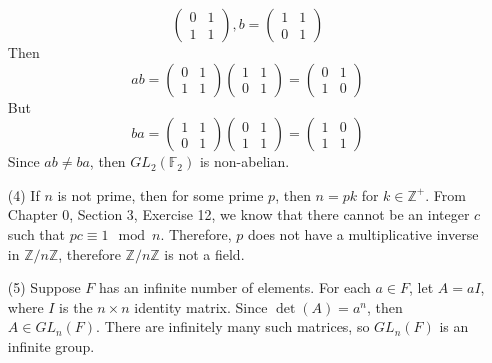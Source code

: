 \documentclass[12pt]{article}
\begin{document}
\begin{itemize}
$$\begin{pmatrix}
0 & 1 \\
1 & 1
\end{pmatrix}, b = \begin{pmatrix}
1 & 1 \\
0 & 1
\end{pmatrix}$$
Then
$$ab = \begin{pmatrix}
0 & 1 \\
1 & 1
\end{pmatrix}\begin{pmatrix}
1 & 1 \\
0 & 1
\end{pmatrix} = \begin{pmatrix}
0 & 1 \\
1 & 0
\end{pmatrix}$$
But
$$ba = \begin{pmatrix}
1 & 1 \\
0 & 1
\end{pmatrix}\begin{pmatrix}
0 & 1 \\
1 & 1
\end{pmatrix} = \begin{pmatrix}
1 & 0 \\
1 & 1
\end{pmatrix}$$
Since $ab \neq ba$, then $GL_2(\mathbb{F}_2)$ is non-abelian.
\item[(4)]
If $n$ is not prime, then for some prime $p$, then $n = pk$ for $k \in \mathbb{Z}^+$. From Chapter 0, Section 3, Exercise 12, we know that there cannot be an integer $c$ such that $pc \equiv 1 \mod n$. Therefore, $p$ does not have a multiplicative inverse in $\mathbb{Z}/n\mathbb{Z}$, therefore $\mathbb{Z}/n\mathbb{Z}$ is not a field.
\item[(5)]
Suppose $F$ has an infinite number of elements. For each $a \in F$, let $A = aI$, where $I$ is the $n \times n$ identity matrix. Since $\det(A) = a^n$, then $A \in GL_n(F)$. There are infinitely many such matrices, so $GL_n(F)$ is an infinite group.


\end{itemize}
\end{document}
